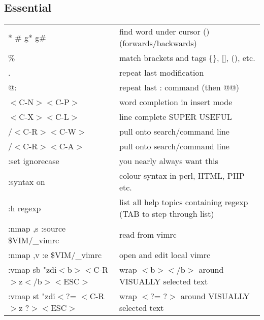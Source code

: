 \subsection{Essential}
\begin{center}
\begin{longtable}{l|l}
* \# g* g\# & find word under cursor () (forwards/backwards)\\
\% & match brackets and tags \{\}, [], (), etc. \\
. & repeat last modification \\
@: & repeat last : command (then @@)\\
$<$C-N$>$$<$C-P$>$ & word completion in insert mode\\
$<$C-X$>$$<$C-L$>$ & line complete SUPER USEFUL\\
/$<$C-R$>$$<$C-W$>$ & pull onto search/command line\\
/$<$C-R$>$$<$C-A$>$ & pull onto search/command line\\
:set ignorecase & you nearly always want this\\
:syntax on & colour syntax in perl, HTML, PHP etc. \\
:h regexp & list all help topics containing regexp (TAB to step through list)\\
:nmap ,s :source \$VIM/\_vimrc & read from vimrc\\
:nmap ,v :e \$VIM/\_vimrc & open and edit local vimrc \\
:vmap sb "zdi$<$b$>$$<$C-R$>$z$<$/b$>$$<$ESC$>$ & wrap $<$b$>$$<$/b$>$ around VISUALLY selected text\\
:vmap st "zdi$<$?= $<$C-R$>$z ?$>$$<$ESC$>$ & wrap $<$?=   ?$>$ around VISUALLY selected text
\end{longtable}
\end{center}
